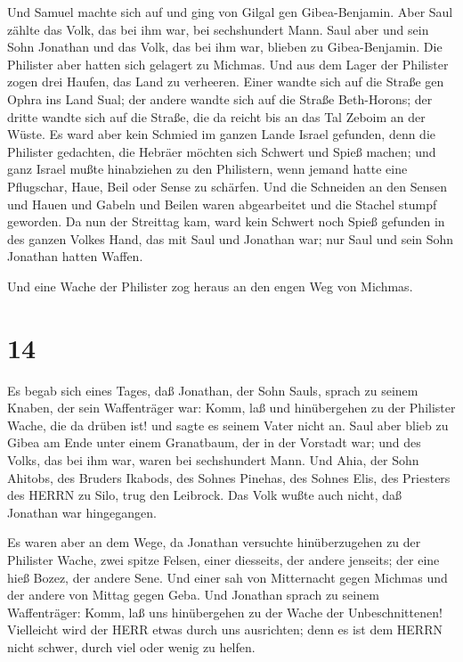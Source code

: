  Und Samuel machte sich auf und ging von Gilgal gen
Gibea-Benjamin. Aber Saul zählte das Volk, das bei ihm war, bei
sechshundert Mann.  Saul aber und sein Sohn Jonathan und
das Volk, das bei ihm war, blieben zu Gibea-Benjamin. Die Philister aber
hatten sich gelagert zu Michmas.  Und aus dem Lager der
Philister zogen drei Haufen, das Land zu verheeren. Einer wandte sich
auf die Straße gen Ophra ins Land Sual;  der andere wandte
sich auf die Straße Beth-Horons; der dritte wandte sich auf die Straße,
die da reicht bis an das Tal Zeboim an der Wüste.  Es ward
aber kein Schmied im ganzen Lande Israel gefunden, denn die Philister
gedachten, die Hebräer möchten sich Schwert und Spieß machen;
 und ganz Israel mußte hinabziehen zu den Philistern, wenn
jemand hatte eine Pflugschar, Haue, Beil oder Sense zu schärfen.
 Und die Schneiden an den Sensen und Hauen und Gabeln und
Beilen waren abgearbeitet und die Stachel stumpf geworden. 
Da nun der Streittag kam, ward kein Schwert noch Spieß gefunden in des
ganzen Volkes Hand, das mit Saul und Jonathan war; nur Saul und sein
Sohn Jonathan hatten Waffen.

 Und eine Wache der Philister zog heraus an den engen Weg
von Michmas.

\hypertarget{section-13}{%
\section{14}\label{section-13}}

 Es begab sich eines Tages, daß Jonathan, der Sohn Sauls,
sprach zu seinem Knaben, der sein Waffenträger war: Komm, laß und
hinübergehen zu der Philister Wache, die da drüben ist! und sagte es
seinem Vater nicht an.  Saul aber blieb zu Gibea am Ende
unter einem Granatbaum, der in der Vorstadt war; und des Volks, das bei
ihm war, waren bei sechshundert Mann.  Und Ahia, der Sohn
Ahitobs, des Bruders Ikabods, des Sohnes Pinehas, des Sohnes Elis, des
Priesters des HERRN zu Silo, trug den Leibrock. Das Volk wußte auch
nicht, daß Jonathan war hingegangen.

 Es waren aber an dem Wege, da Jonathan versuchte
hinüberzugehen zu der Philister Wache, zwei spitze Felsen, einer
diesseits, der andere jenseits; der eine hieß Bozez, der andere Sene.
 Und einer sah von Mitternacht gegen Michmas und der andere
von Mittag gegen Geba.  Und Jonathan sprach zu seinem
Waffenträger: Komm, laß uns hinübergehen zu der Wache der
Unbeschnittenen! Vielleicht wird der HERR etwas durch uns ausrichten;
denn es ist dem HERRN nicht schwer, durch viel oder wenig zu helfen.

